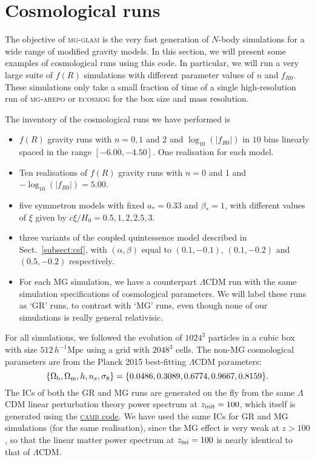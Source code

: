 \section{Cosmological runs}
\label{sect:cos_runs}

The objective of \textsc{mg-glam} is the very fast generation of $N$-body simulations for a wide range of modified gravity models. In this section, we will present some examples of cosmological runs using this code. In particular, we will run a very large suite of $f(R)$ simulations with different parameter values of $n$ and $f_{R0}$. These simulations only take a small fraction of time of a single high-resolution run of \textsc{mg-arepo} or \textsc{ecosmog} for the box size and mass resolution.


The inventory of the cosmological runs we have performed is 
\begin{itemize}
    \item $f(R)$ gravity runs with $n = 0, 1$ and $2$ and $\log_{10}(|f_{R0}|)$ in $10$ bins linearly spaced in the range $[-6.00, -4.50]$. One realisation for each model.
    \item Ten realisations of $f(R)$ gravity runs with $n=0$ and 1 and $-\log_{10} (|f_{R0}|) = 5.00$.
    \item five symmetron models with fixed $a_\ast=0.33$ and $\beta_\ast=1$, with different values of $\xi$ given by $c\xi/H_0=0.5, 1, 2, 2.5, 3$.
    \item three variants of the coupled quintessence model described in Sect.~\ref{subsect:csf}, with $(\alpha,\beta)$ equal to $(0.1,-0.1)$, $(0.1,-0.2)$ and $(0.5,-0.2)$ respectively. 
    \item For each \ac{MG} simulation, we have a  counterpart $\Lambda$CDM run with the same simulation specifications of cosmological parameters. We will label these runs as `GR' runs, to contrast with `\ac{MG}' runs, even though none of our simulations is really general relativisic.
\end{itemize}
For all simulations, we followed the evolution of $1024^3$ particles in a cubic box with size $512 \, h^{-1}\mathrm{Mpc}$ using a grid with $2048^3$ cells. The non-MG cosmological parameters are from the Planck 2015 \citep{Ade:2015xua} best-fitting  $\Lambda$CDM parameters: $$\{\Omega_{\rm b}, \Omega_{\rm m}, h, n_s, \sigma_8\} = \{0.0486,0.3089,0.6774,0.9667,0.8159\}.$$ The ICs of both the \ac{GR} and \ac{MG} runs are generated on the fly from the same $\Lambda$CDM linear perturbation theory power spectrum at $z_{\rm init} = 100$, which itself is generated using the \href{https://camb.info/}{\textsc{camb} code}. We have used the same ICs for \ac{GR} and \ac{MG} simulations (for the same realisation),  since the \ac{MG} effect is very weak at $z > 100$, so that the linear matter power spectrum at $z_{\rm ini}=100$ is nearly identical to that of $\Lambda$CDM.


